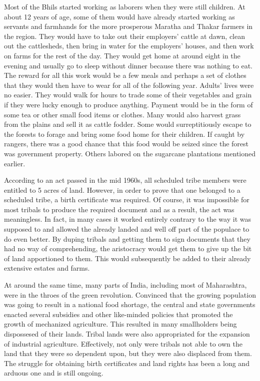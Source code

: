 \documentclass[report.tex]{subfiles}
\begin{document}
Most of the Bhils started working as laborers when they were still children. At about 12 years of age, some of them would have already started working as servants and farmhands for the more prosperous Maratha and Thakar farmers in the region. They would have to take out their employers' cattle at dawn, clean out the cattlesheds, then bring in water for the employers' houses, and then work on farms for the rest of the day. They would get home at around eight in the evening and usually go to sleep without dinner because there was nothing to eat. The reward for all this work would be a few meals and perhaps a set of clothes that they would then have to wear for all of the following year. Adults' lives were no easier. They would walk for hours to trade some of their vegetables and grain if they were lucky enough to produce anything. Payment would be in the form of some tea or other small food items or clothes. Many would also harvest grass from the plains and sell it as cattle fodder. Some would surreptitiously escape to the forests to forage and bring some food home for their children. If caught by rangers, there was a good chance that this food would be seized since the forest was government property. Others labored on the sugarcane plantations mentioned earlier.

According to an act passed in the mid 1960s, all scheduled tribe members were entitled to 5 acres of land. However, in order to prove that one belonged to a scheduled tribe, a birth certificate was required. Of course, it was impossible for most tribals to produce the required document and as a result, the act was meaningless. In fact, in many cases it worked entirely contrary to the way it was supposed to and allowed the already landed and well off part of the populace to do even better. By duping tribals and getting them to sign documents that they had no way of comprehending, the aristocracy would get them to give up the bit of land apportioned to them. This would subsequently be added to their already extensive estates and farms.

At around the same time, many parts of India, including most of Maharashtra, were in the throes of the green revolution. Convinced that the growing population was going to result in a national food shortage, the central and state governments enacted several subsidies and other like-minded policies that promoted the growth of mechanized agriculture. This resulted in many smallholders being dispossesed of their lands. Tribal lands were also appropriated for the expansion of industrial agriculture. Effectively, not only were tribals not able to own the land that they were so dependent upon, but they were also displaced from them. The struggle for obtaining birth certificates and land rights has been a long and arduous one and is still ongoing.
\end{document}
